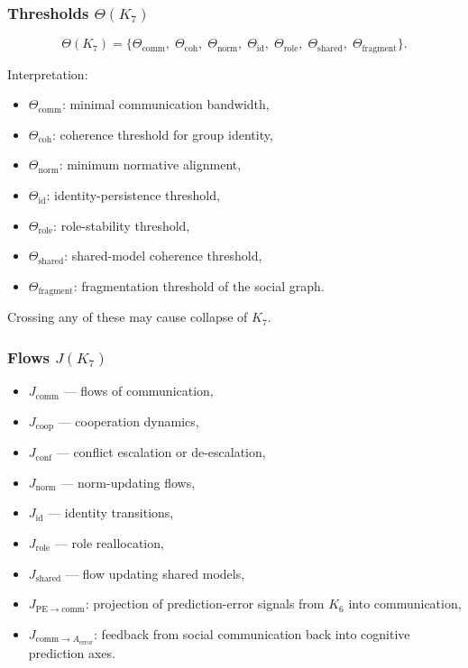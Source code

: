 \subsubsection{Thresholds \texorpdfstring{$\Theta(K_7)$}{\Theta(K_7)}}

\[
\Theta(K_7)=
\{
\Theta_{\mathrm{comm}},\;
\Theta_{\mathrm{coh}},\;
\Theta_{\mathrm{norm}},\;
\Theta_{\mathrm{id}},\;
\Theta_{\mathrm{role}},\;
\Theta_{\mathrm{shared}},\;
\Theta_{\mathrm{fragment}}
\}.
\]

Interpretation:
\begin{itemize}
    \item $\Theta_{\mathrm{comm}}$: minimal communication bandwidth,
    \item $\Theta_{\mathrm{coh}}$: coherence threshold for group identity,
    \item $\Theta_{\mathrm{norm}}$: minimum normative alignment,
    \item $\Theta_{\mathrm{id}}$: identity-persistence threshold,
    \item $\Theta_{\mathrm{role}}$: role-stability threshold,
    \item $\Theta_{\mathrm{shared}}$: shared-model coherence threshold,
    \item $\Theta_{\mathrm{fragment}}$: fragmentation threshold of the social graph.
\end{itemize}

Crossing any of these may cause collapse of $K_7$.

\subsubsection{Flows \texorpdfstring{$J(K_7)$}{J(K_7)}}

\begin{itemize}
    \item $J_{\mathrm{comm}}$ — flows of communication,
    \item $J_{\mathrm{coop}}$ — cooperation dynamics,
    \item $J_{\mathrm{conf}}$ — conflict escalation or de-escalation,
    \item $J_{\mathrm{norm}}$ — norm-updating flows,
    \item $J_{\mathrm{id}}$ — identity transitions,
    \item $J_{\mathrm{role}}$ — role reallocation,
    \item $J_{\mathrm{shared}}$ — flow updating shared models,
    \item $J_{\mathrm{PE}\to\mathrm{comm}}$: projection of prediction-error signals from $K_6$ into communication,
    \item $J_{\mathrm{comm}\to A_{\mathrm{error}}}$: feedback from social communication back into cognitive prediction axes.
\end{itemize}

